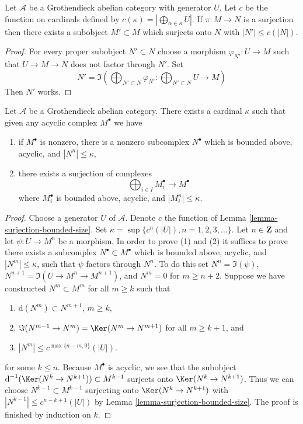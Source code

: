 \begin{lemma}
\label{lemma-surjection-bounded-size}
Let $\mathcal{A}$ be a Grothendieck abelian category with generator $U$.
Let $c$ be the function on cardinals defined by
$c(\kappa) = |\bigoplus_{\alpha \in \kappa} U|$. If $\pi : M \to N$ is a
surjection then there exists a subobject $M' \subset M$ which surjects
onto $N$ with $|N'| \leq c(|N|)$.
\end{lemma}

\begin{proof}
For every proper subobject $N' \subset N$ choose a morphism
$\varphi_{N'} : U \to M$ such that $U \to M \to N$ does not factor
through $N'$. Set
$$
N' = \Im\left(
\bigoplus\nolimits_{N' \subset N} \varphi_{N'} :
\bigoplus\nolimits_{N' \subset N} U \longrightarrow M\right)
$$
Then $N'$ works.
\end{proof}

\begin{lemma}
\label{lemma-acyclic-quotient-complexes-bounded-size}
Let $\mathcal{A}$ be a Grothendieck abelian category. There exists a cardinal
$\kappa$ such that given any acyclic complex $M^\bullet$ we have
\begin{enumerate}
\item if $M^\bullet$ is nonzero, there is a nonzero subcomplex
$N^\bullet$ which is bounded above, acyclic, and $|N^n| \leq \kappa$,
\item there exists a surjection of complexes
$$
\bigoplus\nolimits_{i \in I} M_i^\bullet \longrightarrow M^\bullet
$$
where $M_i^\bullet$ is bounded above, acyclic, and $|M_i^n| \leq \kappa$.
\end{enumerate}
\end{lemma}

\begin{proof}
Choose a generator $U$ of $\mathcal{A}$. Denote $c$ the function of
Lemma \ref{lemma-surjection-bounded-size}.
Set $\kappa = \sup \{c^n(|U|), n = 1, 2, 3, \ldots\}$.
Let $n \in \mathbf{Z}$ and let $\psi : U \to M^n$ be a morphism.
In order to prove (1) and (2) it suffices to prove there exists a subcomplex
$N^\bullet \subset M^\bullet$ which is bounded above, acyclic, and
$|N^m| \leq \kappa$, such that $\psi$ factors through $N^n$.
To do this set $N^n = \Im(\psi)$, $N^{n + 1} = \Im(U \to M^n \to M^{n + 1})$,
and $N^m = 0$ for $m \geq n + 2$.
Suppose we have constructed $N^m \subset M^m$ for all $m \geq k$ such that
\begin{enumerate}
\item $\text{d}(N^m) \subset N^{m + 1}$, $m \geq k$,
\item $\Im(N^{m - 1} \to N^m) = \Ker(N^m \to N^{m + 1})$ for
all $m \geq k + 1$, and
\item $|N^m| \leq c^{\max\{n - m, 0\}}(|U|)$.
\end{enumerate}
for some $k \leq n$. Because $M^\bullet$ is acyclic, we see that the subobject
$\text{d}^{-1}(\Ker(N^k \to N^{k + 1})) \subset M^{k - 1}$ surjects onto
$\Ker(N^k \to N^{k + 1})$. Thus we can choose $N^{k - 1} \subset M^{k - 1}$
surjecting onto $\Ker(N^k \to N^{k + 1})$ with
$|N^{k - 1}| \leq c^{n - k + 1}(|U|)$ by
Lemma \ref{lemma-surjection-bounded-size}. The proof is finished by
induction on $k$.
\end{proof}

